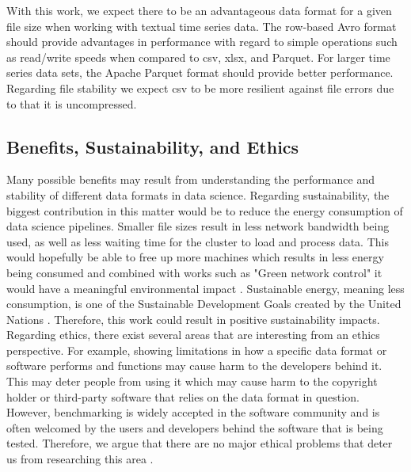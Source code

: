 With this work, we expect there to be an advantageous data format for a given file size when working with textual time series data. The row-based Avro format should provide advantages in performance with regard to simple operations such as read/write speeds when compared to csv, xlsx, and Parquet. For larger time series data sets, the Apache Parquet format should provide better performance. Regarding file stability we expect csv to be more resilient against file errors due to that it is uncompressed.


\subsection{Benefits, Sustainability, and Ethics}
\label{sect:benefits}
Many possible benefits may result from understanding the performance and stability of different data formats in data science. Regarding sustainability, the biggest contribution in this matter would be to reduce the energy consumption of data science pipelines. Smaller file sizes result in less network bandwidth being used, as well as less waiting time for the cluster to load and process data. This would hopefully be able to free up more machines which results in less energy being consumed and combined with works such as "Green network control" it would have a meaningful environmental impact \cite{cao_data_2017}. Sustainable energy, meaning less consumption, is one of the Sustainable Development Goals created by the United Nations \cite{bexell_responsibility_2017}. Therefore, this work could result in positive sustainability impacts. Regarding ethics, there exist several areas that are interesting from an ethics perspective. For example, showing limitations in how a specific data format or software performs and functions may cause harm to the developers behind it. This may deter people from using it which may cause harm to the copyright holder or third-party software that relies on the data format in question. However, benchmarking is widely accepted in the software community and is often welcomed by the users and developers behind the software that is being tested. Therefore, we argue that there are no major ethical problems that deter us from researching this area \cite{bexell_responsibility_2017}. 

  
